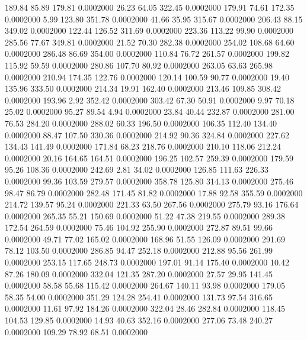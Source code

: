  189.84   85.89  179.81   0.0002000
  26.23   64.05  322.45   0.0002000
 179.91   74.61  172.35   0.0002000
   5.99  123.80  351.78   0.0002000
  41.66   35.95  315.67   0.0002000
 206.43   88.15  349.02   0.0002000
 122.44  126.52  311.69   0.0002000
 223.36  113.22   99.90   0.0002000
 285.56   77.67  349.81   0.0002000
  21.52   70.30  282.38   0.0002000
 254.02  108.68   64.60   0.0002000
 286.48   86.69  354.00   0.0002000
 110.84   76.72  261.57   0.0002000
 199.82  115.92   59.59   0.0002000
 280.86  107.70   80.92   0.0002000
 263.05   63.63  265.98   0.0002000
 210.94  174.35  122.76   0.0002000
 120.14  100.59   90.77   0.0002000
  19.40  135.96  333.50   0.0002000
 214.34   19.91  162.40   0.0002000
 213.46  109.85  308.42   0.0002000
 193.96    2.92  352.42   0.0002000
 303.42   67.30   50.91   0.0002000
   9.97   70.18   25.02   0.0002000
  95.27   89.54    4.94   0.0002000
  23.84   40.44  232.87   0.0002000
 281.00   76.53  284.20   0.0002000
 288.02   60.33  196.50   0.0002000
 106.35  112.40  134.40   0.0002000
  88.47  107.50  330.36   0.0002000
 214.92   90.36  324.84   0.0002000
 227.62  134.43  141.49   0.0002000
 171.84   68.23  218.76   0.0002000
 210.10  118.06  212.24   0.0002000
  20.16  164.65  164.51   0.0002000
 196.25  102.57  259.39   0.0002000
 179.59   95.26  108.36   0.0002000
 242.69    2.81   34.02   0.0002000
 126.85  111.63  226.33   0.0002000
  99.36  103.59  279.57   0.0002000
 358.78  125.80  314.13   0.0002000
 275.46   98.47   86.79   0.0002000
 282.48  171.45   81.82   0.0002000
  17.88   92.58  355.59   0.0002000
 214.72  139.57   95.24   0.0002000
 221.33   63.50  267.56   0.0002000
 275.79   93.16  176.64   0.0002000
 265.35   55.21  150.69   0.0002000
  51.22   47.38  219.55   0.0002000
 289.38  172.54  264.59   0.0002000
  75.46  104.92  255.90   0.0002000
 272.87   89.51   99.66   0.0002000
  49.71   77.02  165.02   0.0002000
 168.96   51.55  126.09   0.0002000
 291.69   78.12  103.50   0.0002000
 286.85   94.47  252.18   0.0002000
 212.88   95.56  261.99   0.0002000
 253.15  117.65  248.73   0.0002000
 197.01   91.14  175.40   0.0002000
  10.42   87.26  180.09   0.0002000
 332.04  121.35  287.20   0.0002000
  27.57   29.95  141.45   0.0002000
  58.58   55.68  115.42   0.0002000
 264.67  140.11   93.98   0.0002000
 179.05   58.35   54.00   0.0002000
 351.29  124.28  254.41   0.0002000
 131.73   97.54  316.65   0.0002000
  11.61   97.92  184.26   0.0002000
 322.04   28.46  282.84   0.0002000
 118.45  104.53  129.85   0.0002000
  14.93   40.63  352.16   0.0002000
 277.06   73.48  240.27   0.0002000
 109.29   78.92   68.51   0.0002000
